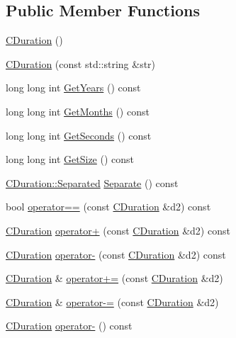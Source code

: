 \subsection*{Public Member Functions}
\begin{DoxyCompactItemize}
\item 
\mbox{\hyperlink{class_c_duration_a5d2b1b889b86db60fc9e36ca9dc32673}{C\+Duration}} ()
\item 
\mbox{\hyperlink{class_c_duration_a45d12f047efd2fdef5b410f5b28be1b7}{C\+Duration}} (const std\+::string \&str)
\item 
long long int \mbox{\hyperlink{class_c_duration_a41b44af669456e4e24fa39cd0d920d3b}{Get\+Years}} () const
\item 
long long int \mbox{\hyperlink{class_c_duration_a95b4e8f27009897daa9f0d39e659f292}{Get\+Months}} () const
\item 
long long int \mbox{\hyperlink{class_c_duration_a775dfa18b6c377ef658c332fd5228925}{Get\+Seconds}} () const
\item 
long long int \mbox{\hyperlink{class_c_duration_ae7411129a262f6893dd93c2143aa68c7}{Get\+Size}} () const
\item 
\mbox{\hyperlink{struct_c_duration_1_1_separated}{C\+Duration\+::\+Separated}} \mbox{\hyperlink{class_c_duration_a2cd6a0d25796d4c021974394d8c32f54}{Separate}} () const
\item 
bool \mbox{\hyperlink{class_c_duration_a1278f84b8c078fee677ab946f12c37b7}{operator==}} (const \mbox{\hyperlink{class_c_duration}{C\+Duration}} \&d2) const
\item 
\mbox{\hyperlink{class_c_duration}{C\+Duration}} \mbox{\hyperlink{class_c_duration_a54d59b75c2785839f0fe0261b2f404dc}{operator+}} (const \mbox{\hyperlink{class_c_duration}{C\+Duration}} \&d2) const
\item 
\mbox{\hyperlink{class_c_duration}{C\+Duration}} \mbox{\hyperlink{class_c_duration_a632f49f5add3093c557a1ff32837380b}{operator-\/}} (const \mbox{\hyperlink{class_c_duration}{C\+Duration}} \&d2) const
\item 
\mbox{\hyperlink{class_c_duration}{C\+Duration}} \& \mbox{\hyperlink{class_c_duration_a9162573d7401542397c29c7b1b6b2475}{operator+=}} (const \mbox{\hyperlink{class_c_duration}{C\+Duration}} \&d2)
\item 
\mbox{\hyperlink{class_c_duration}{C\+Duration}} \& \mbox{\hyperlink{class_c_duration_a171806344ce4878d7b76762a75e4b713}{operator-\/=}} (const \mbox{\hyperlink{class_c_duration}{C\+Duration}} \&d2)
\item 
\mbox{\hyperlink{class_c_duration}{C\+Duration}} \mbox{\hyperlink{class_c_duration_a2cf513c8690e1c931fd70c547226c350}{operator-\/}} () const
\end{DoxyCompactItemize}
